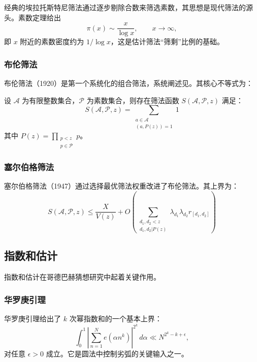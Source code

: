 经典的埃拉托斯特尼筛法通过逐步剔除合数来筛选素数，其思想是现代筛法的源头。素数定理给出
\begin{equation}
    \pi(x) \sim \frac{x}{\log x}, \qquad x \to \infty,
\end{equation}
即 $x$ 附近的素数密度约为 $1/\log x$，这是估计筛法“筛剩”比例的基础\cite{davenport2000multiplicative}。

\subsubsection{布伦筛法}

布伦筛法（1920）是第一个系统化的组合筛法\cite{brun1920sieve}，系统阐述见\cite{halberstam1974sieve}。其核心不等式为：
\begin{theorem}[布伦筛法]
    设 $\mathcal{A}$ 为有限整数集合，$\mathcal{P}$ 为素数集合，则存在筛法函数 $S(\mathcal{A}, \mathcal{P}, z)$ 满足：
    \begin{equation}
        S(\mathcal{A}, \mathcal{P}, z) = \sum_{\substack{a \in \mathcal{A} \\ (a, P(z))=1}} 1
    \end{equation}
    其中 $P(z) = \prod_{\substack{p < z \\ p \in \mathcal{P}}} p$。
\end{theorem}

\subsubsection{塞尔伯格筛法}

塞尔伯格筛法（1947）通过选择最优筛法权重改进了布伦筛法\cite{selberg1949sieve}。其上界为：
\begin{equation}
    S(\mathcal{A}, \mathcal{P}, z) \leq \frac{X}{V(z)} + O\left(\sum_{\substack{d_1, d_2 < z \\ d_1, d_2 | P(z)}} \lambda_{d_1} \lambda_{d_2} r_{[d_1, d_2]}\right)
\end{equation}

\subsection{指数和估计}

指数和估计在哥德巴赫猜想研究中起着关键作用。

\subsubsection{华罗庚引理}

华罗庚引理给出了 $k$ 次幂指数和的一个基本上界：
\begin{equation}
    \int_0^1 \left| \sum_{n=1}^N e(\alpha n^k) \right|^{2^k} \, d\alpha \ll N^{2^k - k + \epsilon},
\end{equation}
对任意 $\epsilon > 0$ 成立。它是圆法中控制劣弧的关键输入之一\cite{iwaniec2004analytic}。

